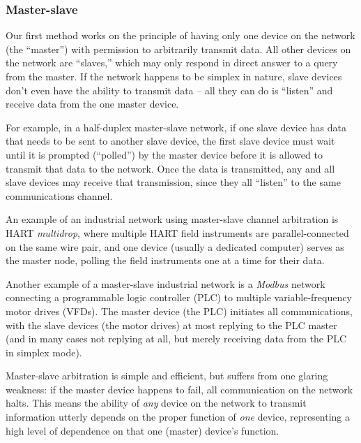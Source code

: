 \filbreak
\subsubsection{Master-slave}

Our first method works on the principle of having only one device on the network (the ``master'') with permission to arbitrarily transmit data.  All other devices on the network are ``slaves,'' which may only respond in direct answer to a query from the master.  If the network happens to be simplex in nature, slave devices don't even have the ability to transmit data -- all they can do is ``listen'' and receive data from the one master device.  

For example, in a half-duplex master-slave network, if one slave device has data that needs to be sent to another slave device, the first slave device must wait until it is prompted (``polled'') by the master device before it is allowed to transmit that data to the network.  Once the data is transmitted, any and all slave devices may receive that transmission, since they all ``listen'' to the same communications channel.  

An example of an industrial network using master-slave channel arbitration is HART \textit{multidrop}, where multiple HART field instruments are parallel-connected on the same wire pair, and one device (usually a dedicated computer) serves as the master node, polling the field instruments one at a time for their data.

Another example of a master-slave industrial network is a \textit{Modbus} network connecting a programmable logic controller (PLC) to multiple variable-frequency motor drives (VFDs).  The master device (the PLC) initiates all communications, with the slave devices (the motor drives) at most replying to the PLC master (and in many cases not replying at all, but merely receiving data from the PLC in simplex mode).    

\vskip 10pt

Master-slave arbitration is simple and efficient, but suffers from one glaring weakness: if the master device happens to fail, all communication on the network halts.  This means the ability of \textit{any} device on the network to transmit information utterly depends on the proper function of \textit{one} device, representing a high level of dependence on that one (master) device's function.

